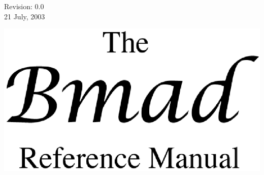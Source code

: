 \thispagestyle{empty}

\begin{flushright}
\large
  Revision: 0.0 \\
  21 July, 2003
\end{flushright}

\vfill

{
\begin{centering}
\includegraphics{bmad_title.ps} \\
\end{centering}
}

\vskip 1in
\vfill
\break